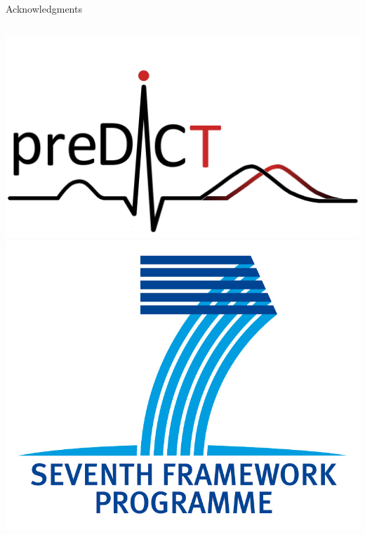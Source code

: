 \documentclass[t,xcolor={usenames,dvipsnames}]{beamer}
\begin{document}
\begin{frame}{Acknowledgments}
\begin{columns}[T]
\begin{column}{.5\linewidth}
\begin{center}
\includegraphics[width=.8\textwidth]{preDiCT}\\ \vspace{.2cm}
\includegraphics[width=.4\textwidth]{FP7-gen-RGB}
\end{center}
\end{column}
\end{columns}
\end{frame}

\appendix
\begin{frame}[allowframebreaks]


\end{frame}
\end{document}
